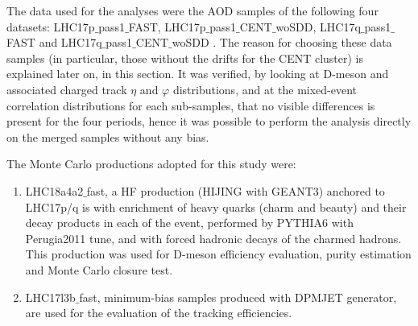 The data used for the analyses were the AOD samples of the following four datasets:  	LHC17p$\_$pass1$\_$FAST, LHC17p$\_$pass1$\_$CENT$\_$woSDD, LHC17q$\_$pass1$\_$FAST and LHC17q$\_$pass1$\_$CENT$\_$woSDD . The reason for choosing these data samples (in particular, those without the drifts for the CENT cluster) is explained later on, in this section. It was verified, by looking at D-meson and associated charged track $\eta$ and $\varphi$ distributions, and at the mixed-event correlation distributions for each sub-samples, that no visible differences is present for the four periods, hence it was possible to perform the analysis directly on the merged samples without any bias.

The Monte Carlo productions adopted for this study were:
 \begin{enumerate}
 \item LHC18a4a2$\_$fast, a HF production (HIJING with GEANT3) anchored to LHC17p/q is with enrichment of heavy quarks (charm and beauty) and their decay products in each of the event, performed by PYTHIA6 with Perugia2011 tune, and with forced hadronic decays of the charmed hadrons. This production was used for D-meson efficiency evaluation, purity estimation and Monte Carlo closure test.
 \item LHC17l3b$\_$fast, minimum-bias samples produced with DPMJET generator, are used for the evaluation of the tracking efficiencies.
\end{enumerate}

